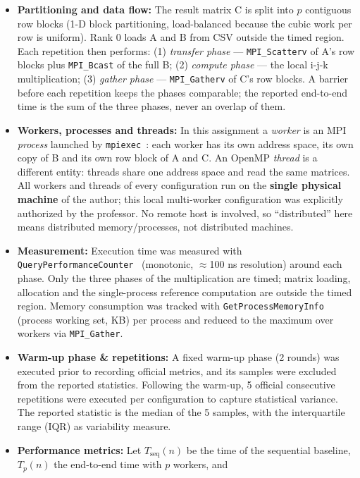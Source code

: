 \documentclass[12pt,a4paper]{article}
\begin{document}
\begin{itemize}
\item \textbf{Partitioning and data flow:} The result matrix C is split into
$p$ contiguous row blocks (1-D block partitioning, load-balanced because the
cubic work per row is uniform). Rank 0 loads A and B from CSV outside the
timed region. Each repetition then performs: (1) \emph{transfer phase} ---
\texttt{MPI\_Scatterv} of A's row blocks plus \texttt{MPI\_Bcast} of the full
B; (2) \emph{compute phase} --- the local i-j-k multiplication; (3)
\emph{gather phase} --- \texttt{MPI\_Gatherv} of C's row blocks. A barrier
before each repetition keeps the phases comparable; the reported end-to-end
time is the sum of the three phases, never an overlap of them.
\item \textbf{Workers, processes and threads:} In this assignment a
\emph{worker} is an MPI \emph{process} launched by \texttt{mpiexec}~\cite{msmpi}: each
worker has its own address space, its own copy of B and its own row block of
A and C. An OpenMP \emph{thread} is a different entity: threads share one
address space and read the same matrices. All workers and threads of every
configuration run on the \textbf{single physical machine} of the author; this
local multi-worker configuration was explicitly authorized by the professor.
No remote host is involved, so ``distributed'' here means distributed
memory/processes, not distributed machines.
\item \textbf{Measurement:} Execution time was measured with
\texttt{QueryPerformanceCounter}~\cite{qpc} (monotonic, $\approx$100 ns resolution)
around each phase. Only the three phases of the multiplication are timed;
matrix loading, allocation and the single-process reference computation are
outside the timed region. Memory consumption was tracked with
\texttt{GetProcessMemoryInfo} (process working set, KB) per process and
reduced to the maximum over workers via \texttt{MPI\_Gather}.
\item \textbf{Warm-up phase \& repetitions:} A fixed warm-up phase (2 rounds)
was executed prior to recording official metrics, and its samples were
excluded from the reported statistics. Following the warm-up, 5 official
consecutive repetitions were executed per configuration to capture
statistical variance. The reported statistic is the median of the 5 samples,
with the interquartile range (IQR) as variability measure.
\item \textbf{Performance metrics:} Let $T_{\mathrm{seq}}(n)$ be the time of
the sequential baseline, $T_p(n)$ the end-to-end time with $p$ workers, and

\end{itemize}
\end{document}
